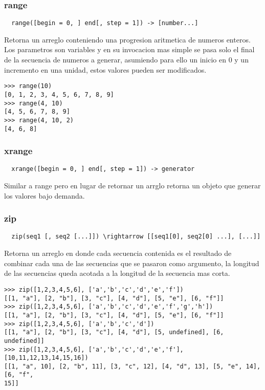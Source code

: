 \subsubsection*{range}
\begin{verbatim}
  range([begin = 0, ] end[, step = 1]) -> [number...]
\end{verbatim}
Retorna un arreglo conteniendo una progresion aritmetica de numeros enteros.
Los parametros son variables y en su invocacion mas simple se pasa solo el final
de la secuencia de numeros a generar, asumiendo para ello un inicio en 0 y un
incremento en una unidad, estos valores pueden ser modificados.
\begin{lstlisting}[style=consola]
>>> range(10)
[0, 1, 2, 3, 4, 5, 6, 7, 8, 9]
>>> range(4, 10)
[4, 5, 6, 7, 8, 9]
>>> range(4, 10, 2)
[4, 6, 8]
\end{lstlisting}

\subsubsection*{xrange}
\begin{verbatim}
  xrange([begin = 0, ] end[, step = 1]) -> generator
\end{verbatim}
Similar a range pero en lugar de retornar un arrglo retorna un objeto que
generar los valores bajo demanda.

\subsubsection*{zip}
\begin{verbatim}
  zip(seq1 [, seq2 [...]]) \rightarrow [[seq1[0], seq2[0] ...], [...]]
\end{verbatim}
Retorna un arreglo en donde cada secuencia contenida es el resultado de combinar
cada una de las secuencias que se pasaron como argumento, la longitud de las
secuencias queda acotada a la longitud de la secuencia mas corta.
\begin{lstlisting}[style=consola]
>>> zip([1,2,3,4,5,6], ['a','b','c','d','e','f'])
[[1, "a"], [2, "b"], [3, "c"], [4, "d"], [5, "e"], [6, "f"]]
>>> zip([1,2,3,4,5,6], ['a','b','c','d','e','f','g','h'])
[[1, "a"], [2, "b"], [3, "c"], [4, "d"], [5, "e"], [6, "f"]]
>>> zip([1,2,3,4,5,6], ['a','b','c','d'])
[[1, "a"], [2, "b"], [3, "c"], [4, "d"], [5, undefined], [6, undefined]]
>>> zip([1,2,3,4,5,6], ['a','b','c','d','e','f'], [10,11,12,13,14,15,16])
[[1, "a", 10], [2, "b", 11], [3, "c", 12], [4, "d", 13], [5, "e", 14], [6, "f",
15]]
\end{lstlisting}

